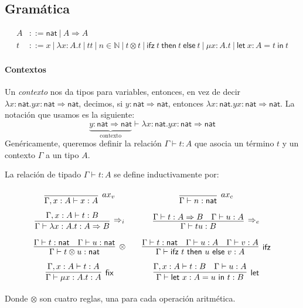 \documentclass[twoside,a4paper,12pt]{article}
\theoremstyle{definition}
\theoremstyle{remark}
\newcommand\ifz[3]{\ensuremath{\mathsf{ifz~}#1\mathsf{~then~}#2\mathsf{~else~}#3}}
\newcommand\fun[2]{\ensuremath{\lambda {#1}{.}{#2}}}
\newcommand\fix[2]{\ensuremath{\mathsf{\mu}#1.#2}}
\newcommand\letl[3]{\ensuremath{\mathsf{let~}#1=#2\mathsf{~in~}#3}}
\newcommand\nat{\ensuremath{\mathsf{nat}}}
\begin{document}
\subsection*{Gramática}

\begin{align*}
  A &::= \nat~|~A\Rightarrow A\\
  t &::= x~|~\fun{x:A}t~|~tt~|~n\in\mathbb N~|~t\otimes t~|~\ifz ttt~|~\fix{x:A}t~|~\letl{x:A}tt
\end{align*}

\paragraph{Contextos}
Un \emph{contexto} nos da tipos para variables, entonces,
en vez de decir $\fun{x:\nat}{yx}:\nat\Rightarrow\nat$, decimos, si
$y:\nat\Rightarrow\nat$, entonces $\fun{x:\nat}{yx}:\nat\Rightarrow\nat$. La
notación que usamos es la siguiente:
\[
  \underbrace{y:\nat\Rightarrow\nat}_{\textrm{contexto}}\vdash\fun{x:\nat}{yx}:\nat\Rightarrow\nat
\]
Genéricamente, queremos definir la relación $\Gamma\vdash t:A$ que asocia un
término $t$ y un contexto $\Gamma$ a un tipo $A$.

\begin{definicion}{4.2}
  \label{def:ST}
  La relación de tipado $\Gamma\vdash t:A$ se define inductivamente por:
  \[\arraycolsep=10pt\def\arraystretch{2.6}
    \begin{array}{cc}
      \infer[ax_v]
      {\Gamma,x:A\vdash x:A}
      {}
      &
        \infer[ax_c]
        {\Gamma\vdash n:\nat}
        {}
      \\
      \infer[\Rightarrow_i]
      {\Gamma\vdash\fun{x:A}t:A\Rightarrow B}
      {\Gamma,x:A\vdash t:B}
      &
        \infer[\Rightarrow_e]
        {\Gamma\vdash tu:B}
        {\Gamma\vdash t:A\Rightarrow B & \Gamma\vdash u:A}
      \\
      \infer[\otimes]
      {\Gamma\vdash t\otimes u:\nat}
      {\Gamma\vdash t:\nat & \Gamma\vdash u:\nat}
      &
        \infer[\mathsf{ifz}]
        {\Gamma\vdash\ifz tuv:A}
        {\Gamma\vdash t:\nat & \Gamma\vdash u:A & \Gamma\vdash v:A}
      \\
      \infer[\mathsf{fix}]
      {\Gamma\vdash\fix{x:A}t:A}
      {\Gamma,x:A\vdash t:A}
      &
        \infer[\mathsf{let}]
        {\Gamma\vdash\letl{x:A}ut:B}
        {\Gamma,x:A\vdash t:B & \Gamma\vdash u:A}
    \end{array}
  \]
  Donde $\otimes$ son cuatro reglas, una para cada operación aritmética.
\end{definicion}
\end{document}
